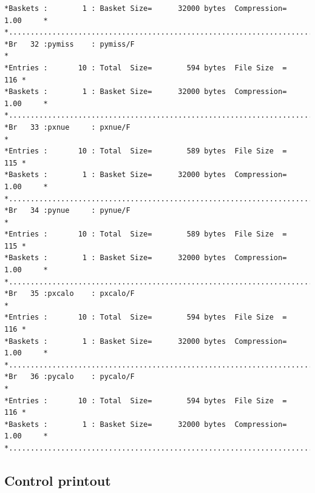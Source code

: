 {\begin{verbatim}
*Baskets :        1 : Basket Size=      32000 bytes  Compression=   1.00     *
*............................................................................*
*Br   32 :pymiss    : pymiss/F                                               *
*Entries :       10 : Total  Size=        594 bytes  File Size  =        116 *
*Baskets :        1 : Basket Size=      32000 bytes  Compression=   1.00     *
*............................................................................*
*Br   33 :pxnue     : pxnue/F                                                *
*Entries :       10 : Total  Size=        589 bytes  File Size  =        115 *
*Baskets :        1 : Basket Size=      32000 bytes  Compression=   1.00     *
*............................................................................*
*Br   34 :pynue     : pynue/F                                                *
*Entries :       10 : Total  Size=        589 bytes  File Size  =        115 *
*Baskets :        1 : Basket Size=      32000 bytes  Compression=   1.00     *
*............................................................................*
*Br   35 :pxcalo    : pxcalo/F                                               *
*Entries :       10 : Total  Size=        594 bytes  File Size  =        116 *
*Baskets :        1 : Basket Size=      32000 bytes  Compression=   1.00     *
*............................................................................*
*Br   36 :pycalo    : pycalo/F                                               *
*Entries :       10 : Total  Size=        594 bytes  File Size  =        116 *
*Baskets :        1 : Basket Size=      32000 bytes  Compression=   1.00     *
*............................................................................*
\end{verbatim}
} 

\newpage
\subsection{Control printout}

